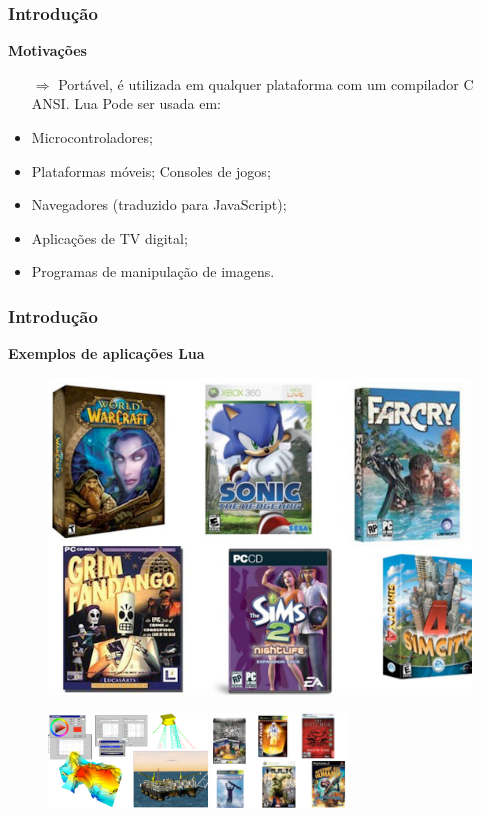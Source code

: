 ﻿\documentclass{beamer}
\begin{document}
\begin{frame}[fragile]
	\frametitle{Introdução}
	{\bf Motivações}\vspace{0.4cm}
	\begin{itemize}
		\item[$\Rightarrow$] Portável, é utilizada em qualquer plataforma com um compilador C ANSI. Lua Pode ser usada em:
		\pause
		\item Microcontroladores; 
		\item Plataformas móveis;
		Consoles de jogos;
		\item Navegadores (traduzido para JavaScript);
		\item Aplicações de TV digital;
		\item Programas de manipulação de imagens.
	\end{itemize}
\end{frame}

\begin{frame}[fragile]
	\frametitle{Introdução}
	{\bf Exemplos de aplicações Lua}\vspace{0.4cm}
		\begin{figure}[!htb]
		\centering
		\includegraphics[width=0.4\linewidth]{imagens/exemplo2}
		\end{figure}

		\begin{figure}[!htb]
			\centering
			\includegraphics[height=2.5cm]{imagens/exemplo3}
			\label{figdroopy}
			\quad %
			\includegraphics[height=2.5cm]{imagens/exemplo1}
			\label{figsnoop}
			\label{fig01}
		\end{figure}
\end{frame}
\end{document}
